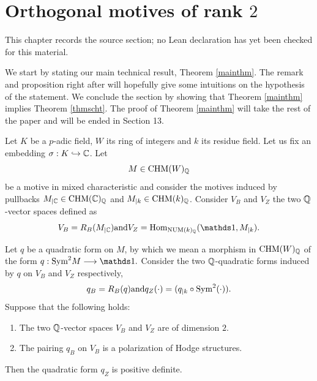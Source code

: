 \chapter{Orthogonal motives of rank $2$}
\label{standard-conjectures-abelian-fourfolds-chapter-08}

\begin{remark}
\label{standard-conjectures-abelian-fourfolds-chapter-08-source}
This chapter records the source section; no Lean declaration has yet been checked for this material.
\notready
\end{remark}

We start by stating our main technical result,  Theorem \ref{mainthm}. The remark and proposition right after will hopefully give some intuitions on the hypothesis of the statement. We conclude the section by showing that Theorem \ref{mainthm} implies  Theorem \ref{thmscht}. The proof of Theorem \ref{mainthm} will take the rest of the paper and will be ended in Section 13.
\begin{theorem}
\notready\label{mainthm}
Let $K$ be a $p$-adic field, $W$  its ring of integers and $k$  its residue field. Let us fix an embedding $\sigma : K \hookrightarrow \mathbb{C}$.
Let \[M \in \mathrm{CHM}(W)_{\mathbb{Q}}\] be a motive in mixed characteristic and consider the motives induced by pullbacks $M_{\vert\mathbb{C}} \in \mathrm{CHM}(\mathbb{C})_{\mathbb{Q}}$ and $M_{\vert{k}} \in \mathrm{CHM}(k)_{\mathbb{Q}}$. Consider $V_B$ and $V_Z$ the two $\mathbb{Q}$-vector spaces defined as
\[V_B = R_B(M_{\vert\C} )
\textrm{and}
V_Z = \Hom_{\NUM(k)_\Q}(\one, M_{\vert{k}}).\]

Let $q$ be a quadratic form on $M$, by which we mean a morphism in $ \mathrm{CHM}(W)_{\mathbb{Q}}$  of the form
$q: \Sym^2 M  \longrightarrow \one.$
 Consider the two $\mathbb{Q}$-quadratic forms induced by $q$ on $V_B$ and $V_Z$ respectively,
\[q_B=R_B(q)   \textrm{and}   q_Z(\cdot)= (q_{\vert{k}} \circ \textnormal{Sym}^2(\cdot)).\]
Suppose that the following holds:
\begin{enumerate}

\item\label{assumptiondim2} The two $\mathbb{Q}$-vector spaces $V_B$  and $V_Z$ are of dimension $2$.

\item The pairing $q_B$ on $V_B$ is a polarization of Hodge structures.

\end{enumerate}


Then the quadratic form $q_Z$ is positive definite.

\end{theorem}

